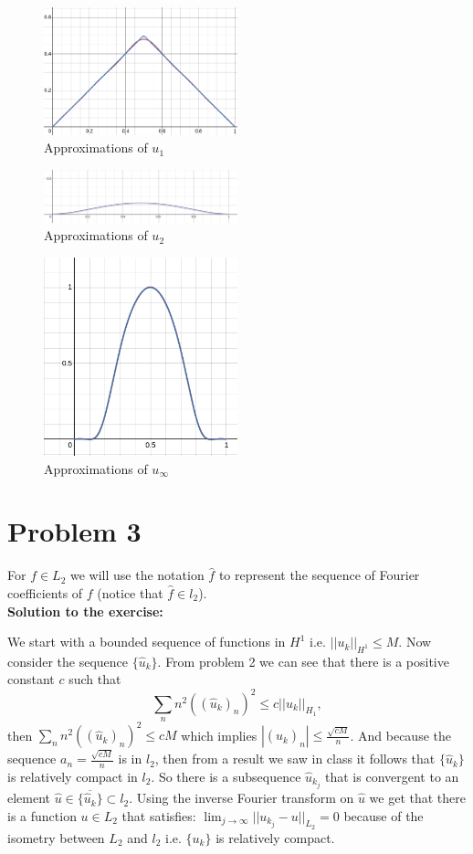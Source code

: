 \documentclass{article}
\begin{document}
\begin{figure}[ht]
\caption{Approximations of $u_1$}
\centering
\includegraphics[width=0.5\textwidth]{u_1Approx.png}
\end{figure}

\begin{figure}[ht]
\caption{Approximations of $u_2$}
\centering
\includegraphics[width=0.5\textwidth]{u_2Approx.png}
\end{figure}

\begin{figure}[ht]
\caption{Approximations of $u_\infty$}
\centering
\includegraphics[width=0.5\textwidth]{u_infApprox.png}
\end{figure}
\newpage
\section{Problem 3}
For $f\in L_2$ we will use the notation	$\hat f$ to represent the sequence of
Fourier coefficients of $f$ (notice that $\hat f\in l_2$).\\
\textbf{Solution to the exercise:}

We start with a bounded sequence of functions in $H^1$ i.e. $||u_k||_{H^1}\leq M$.
Now consider the sequence $\{\hat u_k\}$. From problem 2 we can see that there
is a positive constant $c$ such that
\[
	\sum_nn^2((\hat u_k)_n)^2\leq c ||u_k||_{H_1},
\]
then $\sum_nn^2((\hat u_k)_n)^2\leq cM$ which implies $|(\hat u_k)_n|\leq
\frac{\sqrt{cM}}{n}$. And because the sequence $a_n=\frac{\sqrt{cM}}{n}$ is in
$l_2$, then from a result we saw in class it follows that $\{\hat
u_k\}$ is relatively compact in $l_2$. So there is a subsequence
$\hat u_{k_j}$ that is convergent to an element $\hat u\in \overline{\{\hat u_k\}}\subset
l_2$. Using the inverse Fourier transform on $\hat u$ we get that there is a
function $u\in L_2$ that satisfies: $\lim_{j\to\infty}||u_{k_j}-u||_{L_2}=0$
because of the isometry between $L_2$ and $l_2$ i.e. $\{u_k\}$ is relatively
compact.
\end{document}
